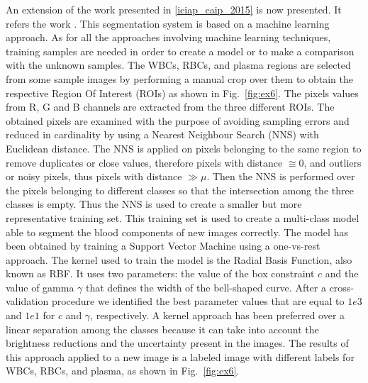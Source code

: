 \documentclass[final,a4paper,12pt,english]{UnicaPhdThesis3}
\begin{document}
{An extension of the work presented in \ref{iciap_caip_2015} is now presented. It refers the work \cite{DiRuberto2016}.
This segmentation system is based on a machine learning approach. As for all the approaches involving machine learning techniques, training samples are needed in order to create a model or to make a comparison with the unknown samples. The WBCs, RBCs, and plasma regions are selected from some sample images by performing a manual crop over them to obtain the respective Region Of Interest (ROIs) as shown in Fig.~\ref{fig:ex6}. The pixels values from R, G and B channels are extracted from the three different ROIs. The obtained pixels are examined with the purpose of avoiding sampling errors and reduced in cardinality by using a Nearest Neighbour Search (NNS) with Euclidean distance. The NNS is applied on pixels belonging to the same region to remove duplicates or close values, therefore pixels with distance $ \cong 0$, and outliers or noisy pixels, thus pixels with distance $ \gg \mu$. Then the NNS is performed over the pixels belonging to different classes so that the intersection among the three classes is empty. Thus the NNS is used to create a smaller but more representative training set. This training set is used to create a multi-class model able to segment the blood components of new images correctly. The model has been obtained by training a Support Vector Machine using a one-vs-rest approach. The kernel used to train the model is the Radial Basis Function, also known as RBF. It uses two parameters: the value of the box constraint $c$ and the value of gamma $\gamma$ that defines the width of the bell-shaped curve. After a cross-validation procedure we identified the best parameter values that are equal to $1e3$ and $1e1$ for $c$ and $\gamma$, respectively. A kernel approach has been preferred over a linear separation among the classes because it can take into account the brightness reductions and the uncertainty present in the images. The results of this approach applied to a new image is a labeled image with different labels for WBCs, RBCs, and plasma, as shown in Fig.~\ref{fig:ex6}. 
}
\end{document}
